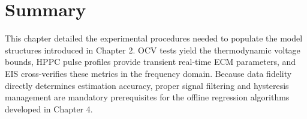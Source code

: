 \section{Summary}
\label{sec:summary_ch3}

This chapter detailed the experimental procedures needed to populate the model structures introduced in Chapter 2. OCV tests yield the thermodynamic voltage bounds, HPPC pulse profiles provide transient real-time ECM parameters, and EIS cross-verifies these metrics in the frequency domain. Because data fidelity directly determines estimation accuracy, proper signal filtering and hysteresis management are mandatory prerequisites for the offline regression algorithms developed in Chapter 4.